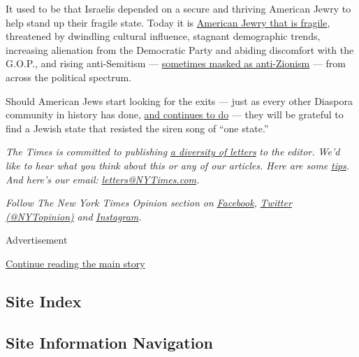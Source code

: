 It used to be that Israelis depended on a secure and thriving American
Jewry to help stand up their fragile state. Today it is
\href{https://www.tabletmag.com/sections/arts-letters/articles/the-collapse}{American
Jewry that is fragile}, threatened by dwindling cultural influence,
stagnant demographic trends, increasing alienation from the Democratic
Party and abiding discomfort with the G.O.P., and rising anti-Semitism
---
\href{https://www.nytimes3xbfgragh.onion/2019/02/08/opinion/sunday/israel-progressive-anti-semitism.html}{sometimes
masked as anti-Zionism} --- from across the political spectrum.

Should American Jews start looking for the exits --- just as every other
Diaspora community in history has done,
\href{https://www.nationalgeographic.com/history/2019/11/french-jews-fleeing-country/}{and
continues to do} --- they will be grateful to find a Jewish state that
resisted the siren song of ``one state.''

\emph{The Times is committed to publishing}
\href{https://www.nytimes3xbfgragh.onion/2019/01/31/opinion/letters/letters-to-editor-new-york-times-women.html}{\emph{a
diversity of letters}} \emph{to the editor. We'd like to hear what you
think about this or any of our articles. Here are some}
\href{https://help.nytimes3xbfgragh.onion/hc/en-us/articles/115014925288-How-to-submit-a-letter-to-the-editor}{\emph{tips}}\emph{.
And here's our email:}
\href{mailto:letters@NYTimes.com}{\emph{letters@NYTimes.com}}\emph{.}

\emph{Follow The New York Times Opinion section on}
\href{https://www.facebookcorewwwi.onion/nytopinion}{\emph{Facebook}}\emph{,}
\href{http://twitter.com/NYTOpinion}{\emph{Twitter (@NYTopinion)}}
\emph{and}
\href{https://www.instagram.com/nytopinion/}{\emph{Instagram}}\emph{.}

Advertisement

\protect\hyperlink{after-bottom}{Continue reading the main story}

\hypertarget{site-index}{%
\subsection{Site Index}\label{site-index}}

\hypertarget{site-information-navigation}{%
\subsection{Site Information
Navigation}\label{site-information-navigation}}

